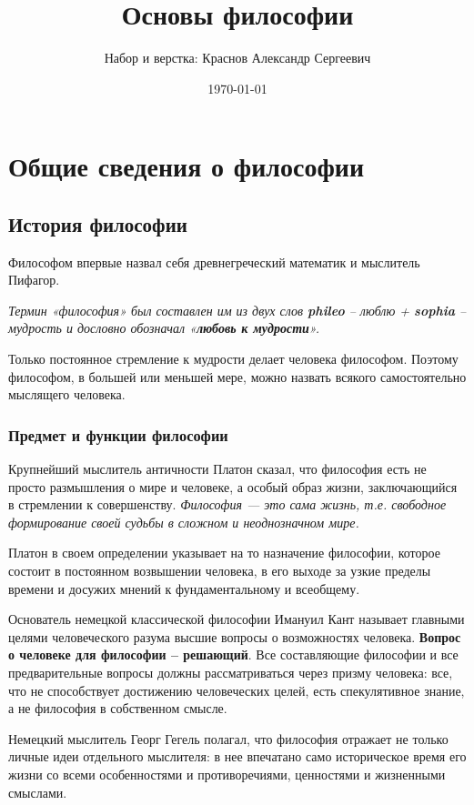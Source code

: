 \documentclass[a4paper, 14pt]{extreport}
\title{Основы философии}
\author{Набор и верстка: Краснов Александр Сергеевич}
\date{\today}
\begin{document}
\maketitle
\tableofcontents
\newpage
\chapter{Общие сведения о философии}
\section{История философии}

Философом впервые назвал себя древнегреческий математик и мыслитель
Пифагор.

\emph{Термин «философия» был составлен им из двух слов \textbf{phileo}
-- люблю + \textbf{sophia} -- мудрость и дословно обозначал
«\textbf{любовь к мудрости}».}

Только постоянное стремление к мудрости делает человека философом.
Поэтому философом, в большей или меньшей мере, можно назвать всякого
самостоятельно мыслящего человека.

\subsection{Предмет и функции философии}

Крупнейший мыслитель античности Платон сказал, что философия есть не
просто размышления о мире и человеке, а особый образ жизни,
заключающийся в стремлении к совершенству. \emph{Философия --- это сама
жизнь, т.е. свободное формирование своей судьбы в сложном и
неоднозначном мире.}

Платон в своем определении указывает на то назначение философии, которое
состоит в постоянном возвышении человека, в его выходе за узкие пределы
времени и досужих мнений к фундаментальному и всеобщему.

Основатель немецкой классической философии Имануил Кант называет
главными целями человеческого разума высшие вопросы о возможностях
человека. \textbf{Вопрос о человеке для философии -- решающий}. Все
составляющие философии и все предварительные вопросы должны
рассматриваться через призму человека: все, что не способствует
достижению человеческих целей, есть спекулятивное знание, а не философия
в собственном смысле.

Немецкий мыслитель Георг Гегель полагал, что философия отражает не
только личные идеи отдельного мыслителя: в нее впечатано само
историческое время его жизни со всеми особенностями и противоречиями,
ценностями и жизненными смыслами.
\end{document}
